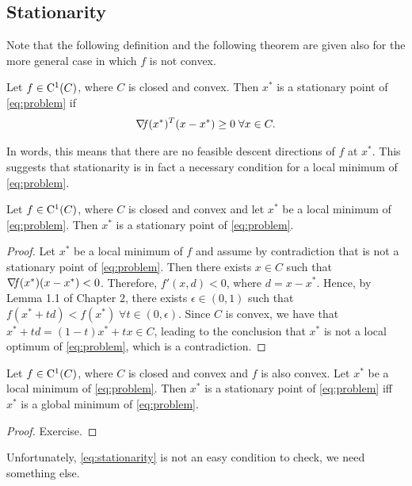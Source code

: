 \documentclass[10pt,a4paper]{article}
\begin{document}
\subsection{Stationarity}
Note that the following definition and the following theorem are given also for the more general case in which $f$ is not convex.
\begin{definition}
	Let $f\in \mathord{\mathrm{C^1}}(C)$, where $C$ is closed and convex. Then $x^*$ is a stationary point of \eqref{eq:problem} if
	\begin{equation}\label{eq:stationarity}
	 \operatorname*{\mathit{\nabla \!f}}(x^*)^T(x-x^*)\geq 0 \; \forall x\in C.
\end{equation}
\end{definition}
\noindent In words, this means that there are no feasible descent directions of $f$ at $x^*$. This suggests that stationarity is in fact a necessary condition for a local minimum of \eqref{eq:problem}.
\begin{theorem}\label{thm:stationarity}
	Let $f\in \mathord{\mathrm{C^1}}(C)$, where $C$ is closed and convex and let $x^*$ be a local minimum of \eqref{eq:problem}. Then $x^*$ is a stationary point of \eqref{eq:problem}.
\end{theorem}
\begin{proof}
	Let $x^*$ be a local minimum of $f$ and assume by contradiction that is not a stationary point of \eqref{eq:problem}. Then there exists $x\in C$ such that $\operatorname*{\mathit{\nabla \!f}}(x^*)(x-x^*)< 0$. Therefore, $f'(x,d)<0$, where $d=x-x^*$. Hence, by Lemma 1.1 of Chapter 2, there exists $\epsilon\in(0,1)$ such that $f(x^*+td)<f(x^*)\;\forall t\in(0,\epsilon).$ Since $C$ is convex, we have that $x^*+td = (1-t)x^*+tx\in C$, leading to the conclusion that $x^*$ is not a local optimum of \eqref{eq:problem}, which is a contradiction.
\end{proof}

\begin{theorem}\label{thm:convex_stationarity}
	Let $f\in \mathord{\mathrm{C^1}}(C)$, where $C$ is closed and convex and $f$ is also convex. Let $x^*$ be a local minimum of \eqref{eq:problem}. Then $x^*$ is a stationary point of \eqref{eq:problem} iff $x^*$ is a global minimum of \eqref{eq:problem}.
\end{theorem}
\begin{proof}
	Exercise.
\end{proof}
\noindent Unfortunately, \eqref{eq:stationarity} is not an easy condition to check, we need something else.
\end{document}
